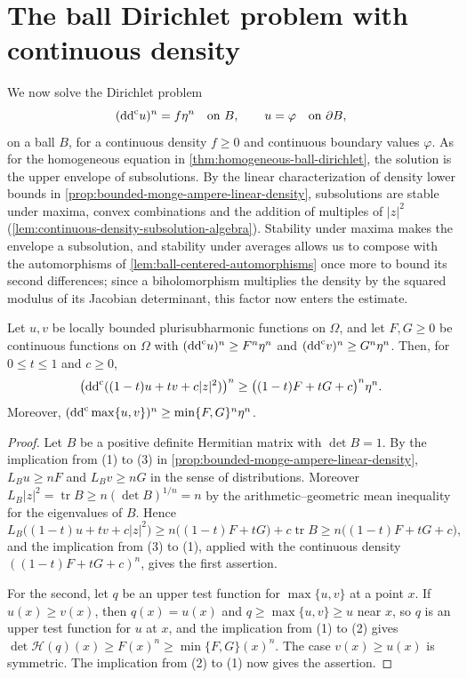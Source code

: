\section{The ball Dirichlet problem with continuous density}
\label{sec:bt-continuous-ball-dirichlet}

We now solve the Dirichlet problem
\[
 (\mathrm{dd}^{\mathrm{c}} u)^n=f\eta^n\quad\text{on }B,\qquad u=\varphi\quad\text{on }\partial B,
\]
on a ball $B$, for a continuous density $f\ge0$ and continuous boundary values $\varphi$. As for the homogeneous equation in \cref{thm:homogeneous-ball-dirichlet}, the solution is the upper envelope of subsolutions. By the linear characterization of density lower bounds in \cref{prop:bounded-monge-ampere-linear-density}, subsolutions are stable under maxima, convex combinations and the addition of multiples of $|z|^2$ (\cref{lem:continuous-density-subsolution-algebra}). Stability under maxima makes the envelope a subsolution, and stability under averages allows us to compose with the automorphisms of \cref{lem:ball-centered-automorphisms} once more to bound its second differences; since a biholomorphism multiplies the density by the squared modulus of its Jacobian determinant, this factor now enters the estimate.

\begin{lemma}\label{lem:continuous-density-subsolution-algebra}
Let $u,v$ be locally bounded plurisubharmonic functions on $\Omega$, and let $F,G\ge0$ be continuous functions on $\Omega$ with $(\mathrm{dd}^{\mathrm{c}} u)^n\ge F^n\eta^n$ and $(\mathrm{dd}^{\mathrm{c}} v)^n\ge G^n\eta^n$. Then, for $0\le t\le1$ and $c\ge0$,
\[
 \bigl(\mathrm{dd}^{\mathrm{c}}((1-t)u+tv+c|z|^2)\bigr)^n
 \ge\bigl((1-t)F+tG+c\bigr)^n\eta^n.
\]
Moreover, $(\mathrm{dd}^{\mathrm{c}}\max\{u,v\})^n\ge\min\{F,G\}^n\eta^n$.
\end{lemma}
\begin{proof}
Let $B$ be a positive definite Hermitian matrix with $\det B=1$. By the implication from (1) to (3) in \cref{prop:bounded-monge-ampere-linear-density}, $L_Bu\ge nF$ and $L_Bv\ge nG$ in the sense of distributions. Moreover $L_B|z|^2=\operatorname{tr}B\ge n(\det B)^{1/n}=n$ by the arithmetic--geometric mean inequality for the eigenvalues of $B$. Hence
\[
 L_B\bigl((1-t)u+tv+c|z|^2\bigr)
 \ge n\bigl((1-t)F+tG\bigr)+c\operatorname{tr}B
 \ge n\bigl((1-t)F+tG+c\bigr),
\]
and the implication from (3) to (1), applied with the continuous density $((1-t)F+tG+c)^n$, gives the first assertion.

For the second, let $q$ be an upper test function for $\max\{u,v\}$ at a point $x$. If $u(x)\ge v(x)$, then $q(x)=u(x)$ and $q\ge\max\{u,v\}\ge u$ near $x$, so $q$ is an upper test function for $u$ at $x$, and the implication from (1) to (2) gives $\det\mathcal H(q)(x)\ge F(x)^n\ge\min\{F,G\}(x)^n$. The case $v(x)\ge u(x)$ is symmetric. The implication from (2) to (1) now gives the assertion.
\end{proof}

